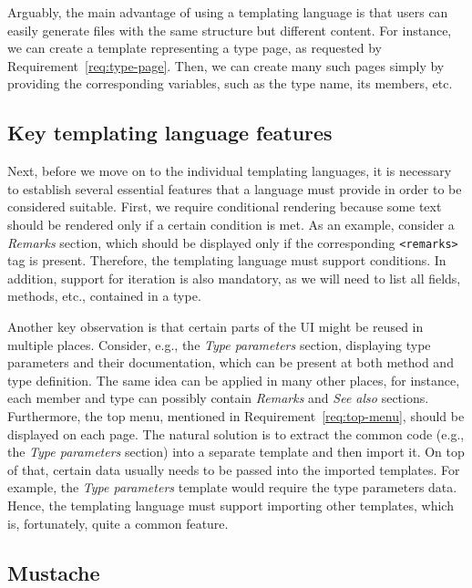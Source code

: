 Arguably, the main advantage of using a templating language is that users can easily generate files with the same structure but different content.
For instance, we can create a template representing a type page, as requested by Requirement~\ref{req:type-page}.
Then, we can create many such pages simply by providing the corresponding variables, such as the type name, its members, etc.

\subsection*{Key templating language features}

Next, before we move on to the individual templating languages, it is necessary to establish several essential features that a language must provide in order to be considered suitable.
First, we require conditional rendering because some text should be rendered only if a certain condition is met.
As an example, consider a \textit{Remarks} section, which should be displayed only if the corresponding \texttt{<remarks>} tag is present.
Therefore, the templating language must support conditions.
In addition, support for iteration is also mandatory, as we will need to list all fields, methods, etc., contained in a type.

\label{sec:templating-language-importing}
Another key observation is that certain parts of the UI might be reused in multiple places.
Consider, e.g., the \textit{Type parameters} section, displaying type parameters and their documentation, which can be present at both method and type definition.
The same idea can be applied in many other places, for instance, each member and type can possibly contain  \textit{Remarks} and \textit{See also} sections.
Furthermore, the top menu, mentioned in Requirement~\ref{req:top-menu}, should be displayed on each page.
The natural solution is to extract the common code (e.g., the \textit{Type parameters} section) into a separate template and then import it.
On top of that, certain data usually needs to be passed into the imported templates. 
For example, the \textit{Type parameters} template would require the type parameters data.
Hence, the templating language must support importing other templates, which is, fortunately, quite a common feature.

\subsection{Mustache}

